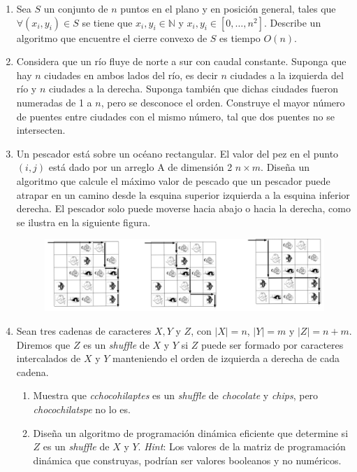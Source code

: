 \documentclass[11pt]{article}
\begin{document}
\begin{enumerate}
    \item Sea $S$ un conjunto de $n$ puntos en el plano y en posici\'on general, tales que $\forall (x_i, y_i) \in S$ se tiene que $x_i,y_i \in \mathbb{N}$ y $x_i, y_i \in [0, \dots, n^2]$. Describe un algoritmo que encuentre el cierre convexo de $S$ es tiempo $O(n)$.

    \item Considera que un r\'io fluye de norte a sur con caudal constante. Suponga que hay $n$ ciudades en ambos lados del r\'io, es decir $n$ ciudades a la izquierda del r\'io y $n$ ciudades a la derecha. Suponga tambi\'en que dichas ciudades fueron numeradas de 1 a $n$, pero se desconoce el orden. Construye el mayor n\'umero de puentes entre ciudades con el mismo n\'umero, tal que dos puentes no se intersecten.

    \item Un pescador est\'a sobre un oc\'eano rectangular. El valor del pez en el punto $(i, j)$ est\'a dado por un arreglo A de dimensi\'on 2 $n \times m$. Dise\~na un algoritmo que calcule el m\'aximo valor de pescado que un pescador puede atrapar en un camino desde la esquina superior izquierda a la esquina inferior derecha. El pescador solo puede moverse hacia abajo o hacia la derecha, como se ilustra en la siguiente figura.

    \begin{figure}[h!]
        \centering
        \includegraphics[width=0.75\linewidth]{lago.PNG}
    \end{figure}

    \item Sean tres cadenas de caracteres $X, Y$ y $Z$, con $|X| = n$, $|Y | = m$ y $|Z| = n + m$. Diremos que $Z$ es un \textit{shuffle} de $X$ y $Y$ si $Z$ puede ser formado por caracteres intercalados de $X$ y $Y$ manteniendo el orden de izquierda a derecha de cada cadena.

    \begin{enumerate}
        \item Muestra que \textit{cchocohilaptes} es un \textit{shuffle} de \textit{chocolate} y \textit{chips}, pero \textit{chocochilatspe} no lo es.

        \item Dise\~na un algoritmo de programaci\'on din\'amica eficiente que determine si $Z$ es un \textit{shuffle} de $X$ y $Y$. \textit{Hint}: Los valores de la matriz de programaci\'on din\'amica que construyas, podr\'ian ser valores booleanos y no num\'ericos.
    \end{enumerate}
\end{enumerate}
\end{document}
